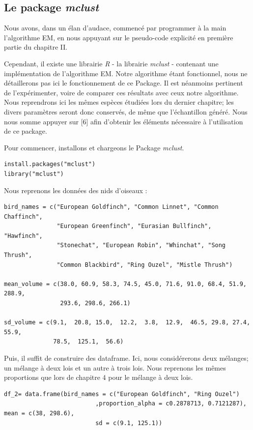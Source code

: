 \documentclass[frenchb]{report}
\newcommand{\1}{\mathbbm{1}}
\theoremstyle{definition}\newtheorem{defn}{Définition}
\theoremstyle{definition}\newtheorem{exm}{Exemple}
\theoremstyle{definition}\newtheorem{nota}{Notation}
\theoremstyle{definition}\newtheorem{rem}{Remarque}
\begin{document}
\begin{appendices}
\chapter{Le package \textit{mclust}}
Nous avons, dans un élan d'audace, commencé par programmer à la main l'algorithme EM, en nous appuyant sur le pseudo-code explicité en première partie du chapitre II. \newline

Cependant, il existe une librairie \textit{R} - la librairie \textit{mclust} - contenant une implémentation de l'algorithme EM. Notre algorithme étant fonctionnel, nous ne détaillerons pas ici le fonctionnement de ce Package. Il est néanmoins pertinent de l'expérimenter, voire de comparer ces résultats avec ceux notre algorithme. Nous reprendrons ici les mêmes espèces étudiées lors du dernier chapitre; les divers paramètres seront donc conservés, de même que l'échantillon généré. Nous nous somme appuyer sur [6] afin d'obtenir les éléments nécessaire à l'utilisation de ce package.

Pour commencer, installons et chargeons le Package \textit{mclust}.
\begin{lstlisting}
install.packages("mclust")
library("mclust")
\end{lstlisting}
%
Nous reprenons les données des nids d'oiseaux :
\begin{lstlisting}
bird_names = c("European Goldfinch", "Common Linnet", "Common Chaffinch",
               "European Greenfinch", "Eurasian Bullfinch", "Hawfinch",
               "Stonechat", "European Robin", "Whinchat", "Song Thrush",
               "Common Blackbird", "Ring Ouzel", "Mistle Thrush")

mean_volume = c(38.0, 60.9, 58.3, 74.5, 45.0, 71.6, 91.0, 68.4, 51.9, 288.9,
                293.6, 298.6, 266.1)

sd_volume = c(9.1,  20.8, 15.0,  12.2,  3.8,  12.9,  46.5, 29.8, 27.4, 55.9,
              78.5,  125.1,  56.6)
\end{lstlisting}
%
Puis, il suffit de construire des dataframe. Ici, nous considérerons deux mélanges; un mélange à deux lois et un autre à trois lois. Nous reprenons les mêmes proportions que lors de chapitre 4 pour le mélange à deux lois.
\begin{lstlisting}
df_2= data.frame(bird_names = c("European Goldfinch", "Ring Ouzel")
                          ,proportion_alpha = c0.2878713, 0.7121287), mean = c(38, 298.6),
                          sd = c(9.1, 125.1))


\end{lstlisting}
\end{appendices}
\end{document}
